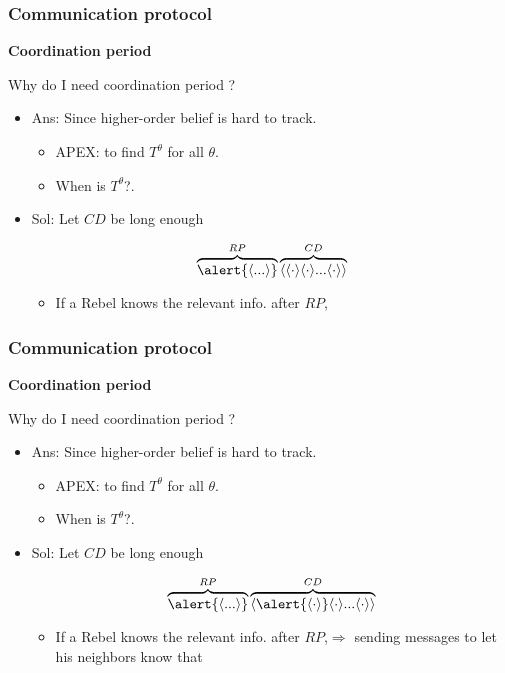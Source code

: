 \documentclass[10pt]{beamer}
\begin{document}
\begin{frame}
  \frametitle{Communication protocol}

\textbf{Coordination period}

Why do I need coordination period ?
\begin{itemize}
\item Ans: Since higher-order belief is hard to track.

\begin{itemize}
\item APEX: to find $T^{\theta}$ for all $\theta$.
\item When is $T^{\theta}$?.
\end{itemize}
\item Sol: Let $CD$ be long enough

\[\overbrace{\alert{\langle ... \rangle}}^{RP}\overbrace{\langle \langle \cdot \rangle \langle \cdot \rangle...\langle \cdot \rangle\rangle}^{CD}\] 
\begin{itemize}
\item If a Rebel knows the relevant info. after $RP$, 
\end{itemize}

\end{itemize}

\end{frame}




\begin{frame}
  \frametitle{Communication protocol}

\textbf{Coordination period}

Why do I need coordination period ?
\begin{itemize}
\item Ans: Since higher-order belief is hard to track.

\begin{itemize}
\item APEX: to find $T^{\theta}$ for all $\theta$.
\item When is $T^{\theta}$?.
\end{itemize}
\item Sol: Let $CD$ be long enough

\[\overbrace{\alert{\langle ... \rangle}}^{RP}\overbrace{\langle \alert{\langle \cdot \rangle} \langle \cdot \rangle...\langle \cdot \rangle\rangle}^{CD}\] 
\begin{itemize}
\item If a Rebel knows the relevant info. after $RP$,$\Rightarrow$ sending messages to let his neighbors know that 
\end{itemize}

\end{itemize}

\end{frame}
\end{document}
